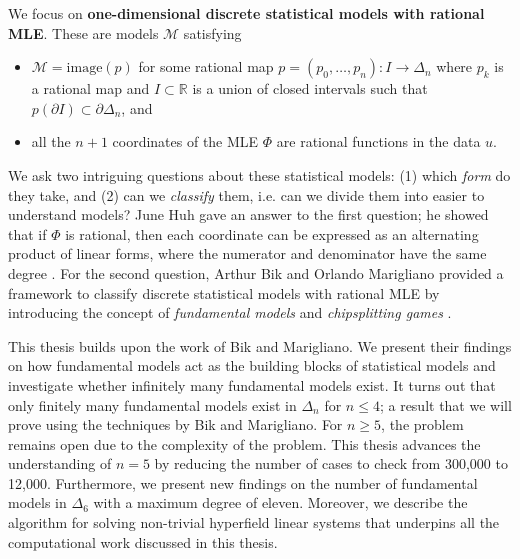 We focus on \textbf{{one-dimensional {discrete} {statistical} {models} with rational MLE}}. These are models \( \mathcal{M} \) satisfying 
\begin{itemize}
    \item \( \mathcal{M} = \mathrm{image}(p) \) for some rational map \( p = (p_0, \dots, p_n): I \to \Delta_n \) where \( p_k \) is a rational map and \( I \subset \mathbb{R} \) is a union of closed intervals such that  \( p(\partial I) \subset \partial \Delta_n \), and
    \item all the \( n+1 \) coordinates of the MLE \( \Phi \) are rational functions in the data \( u \).
\end{itemize}

We ask two intriguing questions about these statistical models: (1) which \emph{form} do they take, and (2) can we \emph{classify} them, i.e. can we divide them into easier to understand models? June Huh gave an answer to the first question; he showed that if \( \Phi \) is rational, then each coordinate can be expressed as an alternating product of linear forms, where the numerator and denominator have the same degree \cite{huh2013varieties, huh2013maximum, duarte2021discrete}. For the second question, Arthur Bik and Orlando Marigliano provided a framework to classify discrete statistical models with rational MLE by introducing the concept of \emph{fundamental models} and \emph{chipsplitting games} \cite{bik2022classifying}.

This thesis builds upon the work of Bik and Marigliano. We present their findings on how fundamental models act as the building blocks of statistical models and investigate whether infinitely many fundamental models exist. It turns out that only finitely many fundamental models exist in \( \Delta_n \) for \( n \leq 4 \); a result that we will prove using the techniques by Bik and Marigliano. For \( n \geq 5 \), the problem remains open due to the complexity of the problem. This thesis advances the understanding of \( n = 5 \) by reducing the number of cases to check from 300,000 to 12,000. Furthermore, we present new findings on the number of fundamental models in \( \Delta_6 \) with a maximum degree of eleven. Moreover, we describe the algorithm for solving non-trivial hyperfield linear systems that underpins all the computational work discussed in this thesis. 

